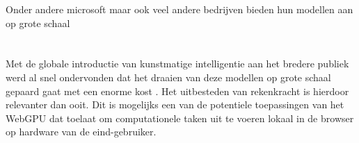 Onder andere microsoft maar ook veel andere bedrijven bieden hun modellen aan op grote schaal

\section{}%
\label{sec:probleemstelling}


Met de globale introductie van kunstmatige intelligentie aan het bredere publiek werd al snel ondervonden dat het draaien van deze modellen op grote schaal gepaard gaat met een enorme kost \textcite{}. Het uitbesteden van rekenkracht is hierdoor relevanter dan ooit. Dit is mogelijks een van de potentiele toepassingen van het WebGPU dat toelaat om computationele taken uit te voeren lokaal in de browser op hardware van de eind-gebruiker.

\section{}%
\label{sec:onderzoeksvraag}


\section{}%
\label{sec:onderzoeksdoelstelling}


